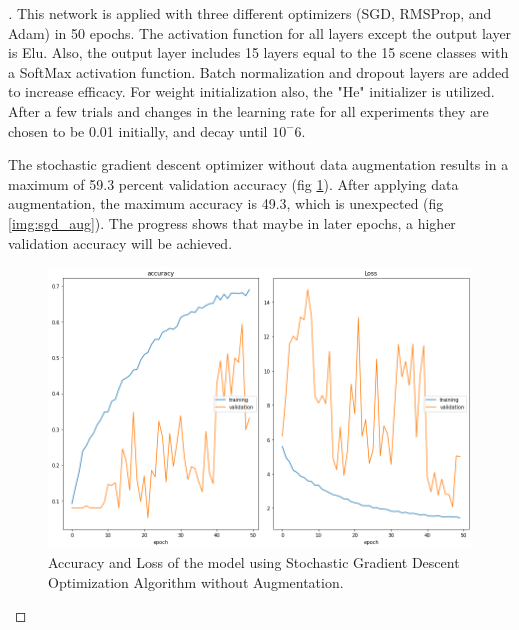 \documentclass[12pt,oneside,geqno]{article}
\begin{document}
\begin{proof}[\color{red}{Solution}]
		This network is applied with three different optimizers (SGD, RMSProp, and Adam) in 50 epochs. The activation function for all layers except the output layer is Elu. Also, the output layer includes 15 layers equal to the 15 scene classes with a SoftMax activation function. Batch normalization and dropout layers are added to increase efficacy. For weight initialization also, the "He" initializer is utilized. After a few trials and changes in the learning rate for all experiments they are chosen to be 0.01 initially, and decay until \(10^-6\).
		
		The stochastic gradient descent optimizer without data augmentation results in a maximum of 59.3 percent validation accuracy (fig \ref{img:sgd}). After applying data augmentation, the maximum accuracy is 49.3, which is unexpected (fig \ref{img:sgd_aug}). The progress shows that maybe in later epochs, a higher validation accuracy will be achieved.
		
		\begin{figure}
			\centering
			\includegraphics[width=\textwidth]{../figs/sgd_acc_loss.png}
			\caption{Accuracy and Loss of the model using Stochastic Gradient Descent Optimization Algorithm without Augmentation.}
			\label{img:sgd}
		\end{figure}
		

\end{proof}
\end{document}
